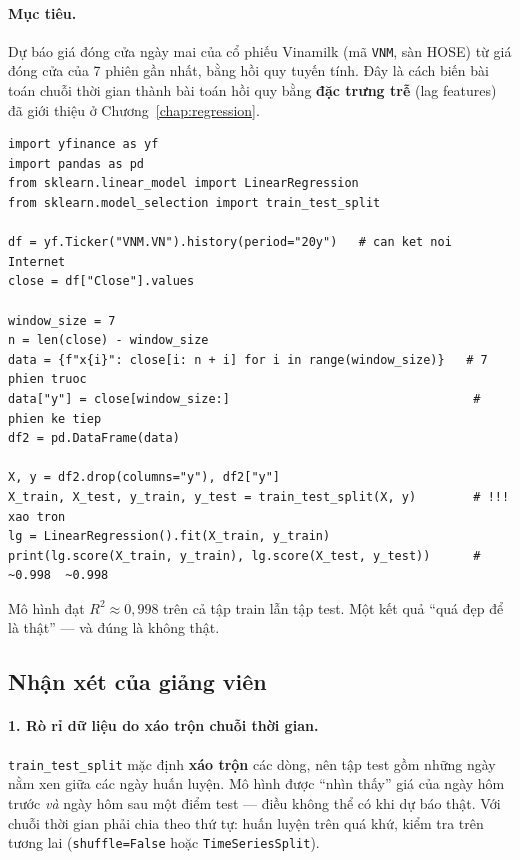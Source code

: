 \paragraph{Mục tiêu.} Dự báo giá đóng cửa ngày mai của cổ phiếu Vinamilk (mã \texttt{VNM}, sàn HOSE) từ giá đóng cửa của 7 phiên gần nhất, bằng hồi quy tuyến tính. Đây là cách biến bài toán chuỗi thời gian thành bài toán hồi quy bằng \textbf{đặc trưng trễ} (lag features) đã giới thiệu ở Chương~\ref{chap:regression}.

\begin{lstlisting}[caption={Lab 4 -- tải dữ liệu và tạo cửa sổ trượt 7 phiên}]
import yfinance as yf
import pandas as pd
from sklearn.linear_model import LinearRegression
from sklearn.model_selection import train_test_split

df = yf.Ticker("VNM.VN").history(period="20y")   # can ket noi Internet
close = df["Close"].values

window_size = 7
n = len(close) - window_size
data = {f"x{i}": close[i: n + i] for i in range(window_size)}   # 7 phien truoc
data["y"] = close[window_size:]                                  # phien ke tiep
df2 = pd.DataFrame(data)

X, y = df2.drop(columns="y"), df2["y"]
X_train, X_test, y_train, y_test = train_test_split(X, y)        # !!! xao tron
lg = LinearRegression().fit(X_train, y_train)
print(lg.score(X_train, y_train), lg.score(X_test, y_test))      # ~0.998  ~0.998
\end{lstlisting}


Mô hình đạt $R^2 \approx 0{,}998$ trên cả tập train lẫn tập test. Một kết quả ``quá đẹp để là thật'' --- và đúng là không thật.

\subsection{Nhận xét của giảng viên}

\paragraph{1. Rò rỉ dữ liệu do xáo trộn chuỗi thời gian.} \texttt{train\_test\_split} mặc định \textbf{xáo trộn} các dòng, nên tập test gồm những ngày nằm xen giữa các ngày huấn luyện. Mô hình được ``nhìn thấy'' giá của ngày hôm trước \textit{và} ngày hôm sau một điểm test --- điều không thể có khi dự báo thật. Với chuỗi thời gian phải chia theo thứ tự: huấn luyện trên quá khứ, kiểm tra trên tương lai (\texttt{shuffle=False} hoặc \texttt{TimeSeriesSplit}).

